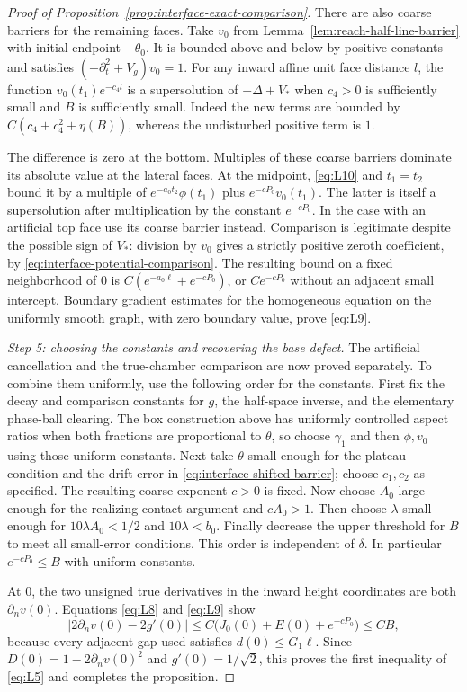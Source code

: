 \begin{proof}[Proof of Proposition~\ref{prop:interface-exact-comparison}]
There are also coarse barriers for the remaining faces.
Take $v_0$ from Lemma~\ref{lem:reach-half-line-barrier} with
initial endpoint $-\theta_0$.  It is bounded above and below by
positive constants and satisfies $(-\partial_t^2+V_g)v_0=1$.
For any inward affine unit face distance $l$, the function
$v_0(t_1)e^{-c_4l}$ is a supersolution of $-\Delta+V_*$ when
$c_4>0$ is sufficiently small and $B$ is sufficiently small.
Indeed the new terms are bounded by $C(c_4+c_4^2+\eta(B))$,
whereas the undisturbed positive term is $1$.

The difference is zero at the bottom.  Multiples of these coarse
barriers dominate its absolute value at the lateral faces.  At the
midpoint, \eqref{eq:L10} and $t_1=t_2$ bound it by a multiple of
$e^{-a_0t_2}\phi(t_1)$ plus $e^{-cP_0}v_0(t_1)$.
The latter is itself a supersolution after multiplication by the
constant $e^{-cP_0}$.  In the case with an artificial top face use
its coarse barrier instead.  Comparison is legitimate despite the
possible sign of $V_*$: division by $v_0$ gives a strictly positive
zeroth coefficient, by \eqref{eq:interface-potential-comparison}.
The resulting bound on a fixed neighborhood of $0$ is
$C(e^{-a_0\ell}+e^{-cP_0})$, or $Ce^{-cP_0}$ without an adjacent
small intercept.  Boundary gradient estimates for the homogeneous
equation on the uniformly smooth graph, with zero boundary value,
prove \eqref{eq:L9}.

\emph{Step 5: choosing the constants and recovering the base defect.}
The artificial cancellation and the true-chamber comparison are now
proved separately.  To combine them uniformly, use the following order
for the constants.  First fix
the decay and comparison constants for $g$, the half-space inverse,
and the elementary phase-ball clearing.  The box construction above
has uniformly controlled aspect ratios when both fractions are
proportional to $\theta$, so choose $\gamma_1$ and then $\phi,v_0$
using those uniform constants.  Next take $\theta$ small enough for
the plateau condition and the drift error in
\eqref{eq:interface-shifted-barrier}; choose $c_1,c_2$ as specified.
The resulting coarse exponent $c>0$ is fixed.  Now choose $A_0$
large enough for the realizing-contact argument and $cA_0>1$.
Then choose $\lambda$ small enough for
$10\lambda A_0<1/2$ and $10\lambda<b_0$.
Finally decrease the upper threshold for $B$ to meet all small-error
conditions.  This order is independent of $\delta$.
In particular $e^{-cP_0}\le B$ with uniform constants.

At $0$, the two unsigned true derivatives in the inward height
coordinates are both $\partial_nv(0)$.  Equations \eqref{eq:L8}
and \eqref{eq:L9} show
\[
 |2\partial_nv(0)-2g'(0)|
       \le C\bigl(J_0(0)+E(0)+e^{-cP_0}\bigr)\le CB,
\]
because every adjacent gap used satisfies $d(0)\le G_1\ell$.
Since $D(0)=1-2\partial_nv(0)^2$ and $g'(0)=1/\sqrt2$,
this proves the first inequality of \eqref{eq:L5} and completes
the proposition.
\end{proof}

